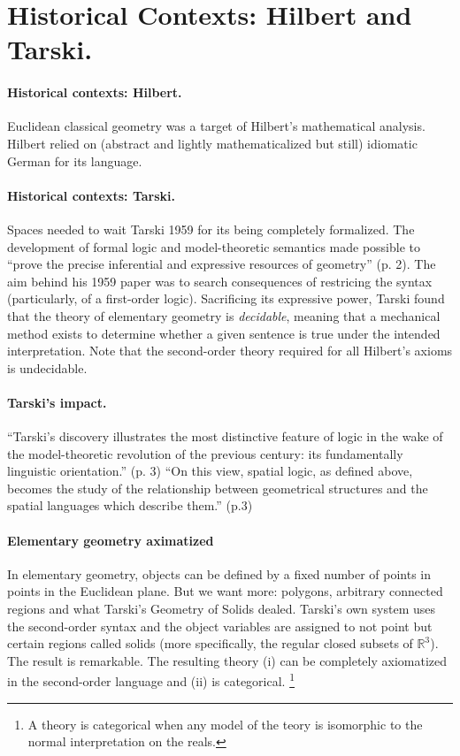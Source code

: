 \documentclass[
10pt, %
a4paper, %
twocolumn, %
landscape %
]{article}
\begin{document}
\section*{Historical Contexts: Hilbert and Tarski.}
\paragraph{Historical contexts: Hilbert.}
Euclidean classical geometry was a target of Hilbert's mathematical analysis.
Hilbert relied on (abstract and lightly mathematicalized but still) idiomatic German for its language.

\paragraph{Historical contexts: Tarski.}
Spaces needed to wait Tarski 1959 for its being completely formalized. The development of formal logic and model-theoretic semantics made possible to ``prove the precise inferential and expressive resources of geometry'' (p. 2).
The aim behind his 1959 paper was to search consequences of restricing the syntax (particularly, of a first-order logic).
Sacrificing its expressive power, Tarski found that the theory of elementary geometry is \emph{decidable}, meaning that a mechanical method exists to determine whether a given sentence is true under the intended interpretation. Note that the second-order theory required for all Hilbert's axioms is undecidable.

\paragraph{Tarski's impact.}
``Tarski's discovery illustrates the most distinctive feature of logic in the wake of the model-theoretic revolution of the previous century: its fundamentally linguistic orientation.'' (p. 3)
``On this view, spatial logic, as defined above, becomes the study of the relationship between geometrical structures and the spatial languages which describe them.'' (p.3)

\paragraph{Elementary geometry aximatized }
In elementary geometry, objects can be defined by a fixed number of points in points in the Euclidean plane. But we want more: polygons, arbitrary connected regions and what Tarski's Geometry of Solids dealed. Tarski's own system uses the second-order syntax and the object variables are assigned to not point but certain regions called solids (more specifically, the regular closed subsets of $\mathbb{R}^3$).
The result is remarkable. The resulting theory (i) can be completely axiomatized in the second-order language and (ii) is categorical.
\footnote{A theory is categorical when any model of the teory is isomorphic to the normal interpretation on the reals.}
\end{document}
